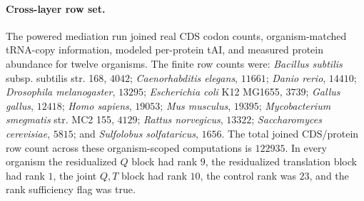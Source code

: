\paragraph{Cross-layer row set.}
The powered mediation run joined real CDS codon counts, organism-matched tRNA-copy information, modeled per-protein tAI, and measured protein abundance for twelve organisms.  The finite row counts were: \emph{Bacillus subtilis} subsp. subtilis str. 168, $4042$; \emph{Caenorhabditis elegans}, $11661$; \emph{Danio rerio}, $14410$; \emph{Drosophila melanogaster}, $13295$; \emph{Escherichia coli} K12 MG1655, $3739$; \emph{Gallus gallus}, $12418$; \emph{Homo sapiens}, $19053$; \emph{Mus musculus}, $19395$; \emph{Mycobacterium smegmatis} str. MC2 155, $4129$; \emph{Rattus norvegicus}, $13322$; \emph{Saccharomyces cerevisiae}, $5815$; and \emph{Sulfolobus solfataricus}, $1656$.  The total joined CDS/protein row count across these organism-scoped computations is $122935$.  In every organism the residualized $Q$ block had rank $9$, the residualized translation block had rank $1$, the joint $Q,T$ block had rank $10$, the control rank was $23$, and the rank sufficiency flag was true.

